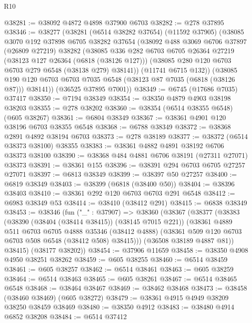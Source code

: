 \begin{lexlean}{R10}
\begin{coremodule}
@38281 := @38092 @4872 @4898 @37900 @6703
@38282 := @278 @37895
@38346 := @38277
    (@38281
      (@6514 @38282 @37654)
      (@11592 @37905)
      (@38085
        @3070
        @192
        @37898
        @6705
        @38282
        @37654
        (@38092
          @488
          @3069
          @6706
          @37897
          (@26809 @27219)
          @38282
          (@38085
            @336
            @282
            @6703
            @6705
            @26364
            @27219
            (@38123 @127 @26364 (@6818 (@38126 @127)))
            (@38085 @280 @120 @6703 @6703 @279 @6548 (@38138 @279) @38141))
          (@11741 @6715 @132))
        (@38085 @190 @120 @6703 @6703 @7035 @6548 (@38123 @87 @7035 (@6818 (@38126 @87))) @38141))
      (@36525 @37895 @7001))
@38349 := @6745 (@17686 @7035) @37417
@38350 := @7194 @38349
@38354 := @38350 @4879 @4903 @38198 @38203
@38355 := @278 @38202
@38360 := @38354 (@6514 @38355 @6548) (@605 @38267)
@38361 := @6804 @38349
@38367 := @38361 @4901 @120 @38196 @6703 @38355 @6548
@38368 := @6788 @38349
@38372 := @38368 @2891 @4892 @38194 @6703
@38373 := @278 @38189
@38377 := @38372 (@6514 @38373 @38100) @38355
@38383 := @38361 @4882 @4891 @38192 @6706 @38373 @38100
@38390 := @38368 @484 @4881 @6706 @38191 (@27311 @27071) @38373
@38391 := @38361 @155
@38396 := @38391 @294 @6703 @6705 @27257 @27071
@38397 := @6813 @38349
@38399 := @38397 @50 @27257
@38400 := @6819 @38349
@38403 := @38399 (@6818 (@38400 @50))
@38404 := @38396 @38403
@38410 := @38361 @292 @120 @6703 @6703 @291 @6548
@38412 := @6983 @38349 @53
@38414 := @38410 (@38412 @291)
@38415 := @6838 @38349
@38453 := @38346
    (fun ("_" : @37907) =>
    @38360
      (@38367
        (@38377
          (@38383
            (@38390 (@38404 (@38414 @38415)) (@38145 @7015 @221))
            (@38361
              @4889
              @511
              @6703
              @6705
              @4888
              @35346
              (@38412 @4888)
              (@38361 @509 @120 @6703 @6703 @508 @6548 (@38412 @508) @38415)))
          (@36508 @38189 @4887 @81))
        @38415)
      (@38177 @38202))
@38454 := @37906 @11659
@38458 := @38350 @4908 @4950 @38251 @38262
@38459 := @605 @38255
@38460 := @6514 @38459
@38461 := @605 @38257
@38462 := @6514 @38461
@38463 := @605 @38259
@38464 := @6514 @38463
@38465 := @605 @38261
@38467 := @6514 @38465 @6548
@38468 := @38464 @38467
@38469 := @38462 @38468
@38473 := @38458 (@38460 @38469) (@605 @38272)
@38479 := @38361 @4915 @4949 @38209 @38250 @38459 @38469
@38480 := @38350 @4912
@38483 := @38480 @4914 @6852 @38208
@38484 := @6514 @37412

\end{coremodule}
\end{lexlean}
